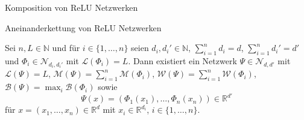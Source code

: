 \documentclass[10pt,aspectratio=169]{beamer}
\theoremstyle{plain} %
\theoremstyle{remark} %
\newcommand{\N}{\mathbb{N}} %
\newcommand{\R}{\mathbb{R}} %
\newcommand{\set}[1]{\{#1\}}
\begin{document}
\begin{frame}{Komposition von ReLU Netzwerken}
    \centering
\end{frame}

\begin{frame}{Aneinanderkettung von ReLU Netzwerken}
    \begin{lemma}
        Sei \(n, L \in\N\) und für \(i\in \set{1,\ldots, n}\) seien \(d_i, d_i' \in \N\), \(\sum_{i=1}^n d_i = d\), \(\sum_{i=1}^n d_i' = d'\) 
        und \(\Phi_i \in \mathcal{N}_{d_i, d_i'}\) 
        mit \(\mathcal{L}(\Phi_i) = L\). Dann existiert ein Netzwerk \(\Psi \in \mathcal{N}_{d, d'}\) 
        mit \(\mathcal{L}(\Psi) = L\), \(\mathcal{M}(\Psi) = \sum_{i=1}^n \mathcal{M}(\Phi_i)\), 
        \(\mathcal{W}(\Psi) = \sum_{i=1}^n \mathcal{W}(\Phi_i)\), \(\mathcal{B}(\Psi) = \max_i \mathcal{B}(\Phi_i)\) sowie 
        \[ \Psi(x) = (\Phi_1(x_1), \ldots, \Phi_n(x_n)) \in \R^{d'} \]
        für \(x = (x_1, \ldots, x_n) \in \R^{d}\) mit \(x_i \in \R^{d_i}\), \(i\in \set{1,\ldots, n}\).
    \end{lemma}
\end{frame}
\end{document}
